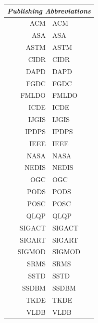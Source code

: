 \documentclass{ucdthesis}       %
\begin{document}
\renewcommand{\baselinestretch}{1.0}
{\normalsize
  \begin{tabular}{rl}
    \multicolumn{2}{c}{\emph{Publishing Abbreviations}} \\
  \hline \hline
    \acs{ACM} & \acl{ACM} \\
    \acs{ASA} & \acl{ASA} \\
    \acs{ASTM} & \acl{ASTM} \\
    \acs{CIDR} & \acl{CIDR} \\
    \acs{DAPD} & \acl{DAPD} \\
    \acs{FGDC} & \acl{FGDC} \\
    \acs{FMLDO} & \acl{FMLDO} \\
    \acs{ICDE} & \acl{ICDE} \\
    \acs{IJGIS} & \acl{IJGIS} \\
    \acs{IPDPS} & \acl{IPDPS} \\
    \acs{IEEE} & \acl{IEEE} \\
    \acs{NASA} & \acl{NASA} \\
    \acs{NEDIS} & \acl{NEDIS} \\
    \acs{OGC} & \acl{OGC} \\
    \acs{PODS} & \acl{PODS} \\
    \acs{POSC} & \acl{POSC} \\
    \acs{QLQP} & \acl{QLQP} \\
    \acs{SIGACT} & \acl{SIGACT} \\
    \acs{SIGART} & \acl{SIGART} \\
    \acs{SIGMOD} & \acl{SIGMOD} \\
    \acs{SRMS} & \acl{SRMS} \\
    \acs{SSTD} & \acl{SSTD} \\
    \acs{SSDBM} & \acl{SSDBM} \\
    \acs{TKDE} & \acl{TKDE} \\
    \acs{VLDB} & \acl{VLDB}
  \end{tabular}
}
\end{document}
